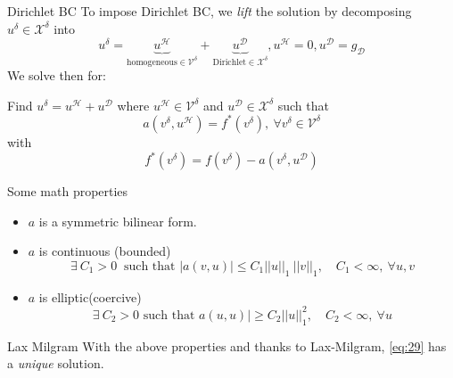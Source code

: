 \begin{frame}{Dirichlet BC}
  To impose Dirichlet BC, we \emph{lift} the solution by decomposing $u^\delta \in \mathcal{X}^\delta$  into
  \begin{equation}
    \label{eq:28}
    u^\delta = \underbrace{u^{\mathcal{H}}}_{\text{homogeneous} \in {\mathcal{V}^\delta}} + \underbrace{u^{\mathcal{D}}}_{\text{Dirichlet} \in {\mathcal{X}^\delta}}, u^{\mathcal{H}} = 0, u^{\mathcal{D}} = g_{\mathcal{D}}
  \end{equation}
  We solve then for:

  Find $u^\delta = u^{\mathcal{H}} + u^{\mathcal{D}}$ where $u^{\mathcal{H}} \in \mathcal{V}^\delta$ and $u^{\mathcal{D}} \in \mathcal{X}^\delta$ such that
  \begin{equation}
    \label{eq:29}
    a( v^\delta, u^{\mathcal{H}}) = f^*(v^\delta), \ \forall v^\delta \in \mathcal{V}^\delta
  \end{equation}
  with
  \begin{equation}
    \label{eq:30}
    f^*(v^\delta) = f(v^\delta) - a(v^\delta, u^{\mathcal{D}})
  \end{equation}
\end{frame}

\begin{frame}{Some math properties}

  \begin{itemize}
  \item $a$ is a symmetric bilinear form. 
  \item $a$ is continuous (bounded)
    \begin{equation}
      \label{eq:31}
      \exists\ C_1 > 0\ \text{ such that } |a(v,u)| \leq C_1 ||u||_1\ ||v||_1,\quad C_1 < \infty,\ \forall u, v
    \end{equation}
  \item $a$ is elliptic(coercive)
    \begin{equation}
      \label{eq:32}
      \exists\ C_2 > 0 \text{ such that } a(u,u)| \geq  C_2 ||u||^2_1,\quad C_2 < \infty,\ \forall u
    \end{equation}
\end{itemize}

\begin{block}{Lax Milgram}
  With the above properties and thanks to Lax-Milgram, \eqref{eq:29} has a \emph{unique} solution.
\end{block}
\end{frame}

